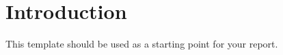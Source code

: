 \section{Introduction\label{chapter1}}
This template should be used as a starting point for your report. 